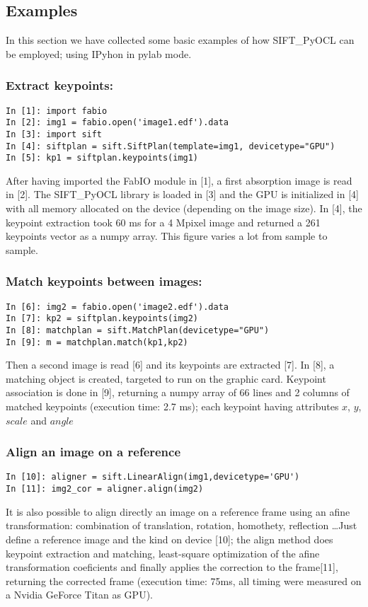 \documentclass[preprint]{iucr}
\begin{document}
\subsection{Examples}

In this section we have collected some basic examples of how
SIFT\_PyOCL can be employed; using IPyhon \cite{ipython} in
pylab \cite{matplotlib} mode.

\subsubsection{Extract keypoints:}
\begin{verbatim}
In [1]: import fabio 
In [2]: img1 = fabio.open('image1.edf').data
In [3]: import sift
In [4]: siftplan = sift.SiftPlan(template=img1, devicetype="GPU")
In [5]: kp1 = siftplan.keypoints(img1)
\end{verbatim}

After having imported the FabIO \cite{fabio} module in [1], a first
absorption image is read in [2]. The SIFT\_PyOCL library is loaded in [3] and the
GPU is initialized in [4] with all memory allocated on the device (depending on
the image size).
In [4], the keypoint extraction took 60 ms for a
4 Mpixel image and returned a 261 keypoints vector as a numpy array. 
This figure varies a lot from sample to sample.

\subsubsection{Match keypoints between images:}
\begin{verbatim}
In [6]: img2 = fabio.open('image2.edf').data
In [7]: kp2 = siftplan.keypoints(img2)
In [8]: matchplan = sift.MatchPlan(devicetype="GPU")
In [9]: m = matchplan.match(kp1,kp2)
\end{verbatim}
Then a second image is read [6] and its keypoints are extracted [7].
In [8], a matching object is created, targeted to run on the graphic card.  
Keypoint association is done in [9], returning a numpy array of 66 lines and 2
columns of matched keypoints (execution time: 2.7 ms); each keypoint having
attributes $x$, $y$, $scale$ and $angle$

\subsubsection{Align an image on a reference}
\begin{verbatim}
In [10]: aligner = sift.LinearAlign(img1,devicetype='GPU')
In [11]: img2_cor = aligner.align(img2)
\end{verbatim}
It is also possible to align directly an image on a reference frame using an
afine transformation: combination of translation, rotation, homothety,
reflection \ldots  Just define a reference image and the kind on device [10];
the align method does keypoint extraction and matching, least-square optimization
of the afine transformation coeficients and finally applies the correction to
the frame[11], returning the corrected frame (execution time: 75ms, all timing
were measured on a Nvidia GeForce Titan as GPU).
\end{document}
